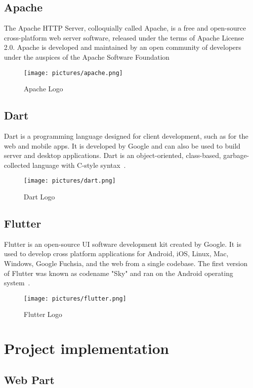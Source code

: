 \documentclass[12pt]{report}
\begin{document}
\subsection{Apache}
The Apache HTTP Server, colloquially called Apache, is a free and open-source cross-platform web server software, released under the terms of Apache License 2.0. Apache is developed and maintained by an open community of developers under the auspices of the Apache Software Foundation
\begin{figure}[!htbp]

        \centering
    \texttt{[image: pictures/apache.png]}
    \caption{Apache Logo}
    \label{fig:apache}
\end{figure}
\subsection{Dart}
Dart is a programming language designed for client development, such as for the web and mobile apps. It is developed by Google and can also be used to build server and desktop applications. Dart is an object-oriented, class-based, garbage-collected language with C-style syntax~\cite{dart}.
\begin{figure}[!htbp]

        \centering
    \texttt{[image: pictures/dart.png]}
    \caption{Dart Logo}
    \label{fig:dart}
\end{figure}
\pagebreak
\subsection{Flutter}
Flutter is an open-source UI software development kit created by Google. It is used to develop cross platform applications for Android, iOS, Linux, Mac, Windows, Google Fuchsia, and the web from a single codebase. The first version of Flutter was known as codename "Sky" and ran on the Android operating system~\cite{flutter}.
\begin{figure}[!htbp]

        \centering
    \texttt{[image: pictures/flutter.png]}
    \caption{Flutter Logo}
    \label{fig:flutter}
\end{figure}
\pagebreak
\setcounter{secnumdepth}{3}
\section{Project implementation}
\subsection{Web Part}
\end{document}
